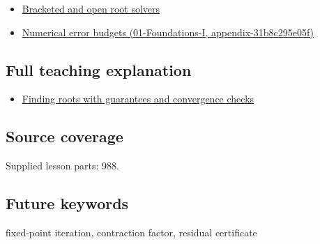 \begin{itemize}
\tightlist
\item
  \hyperref[appendix-f63eb850796d]{Bracketed and open root solvers}
\item
  \href{../01-Foundations-I/main.pdf\#nameddest=appendix-31b8c295e05f}{Numerical error budgets (01-Foundations-I, appendix-31b8c295e05f)}
\end{itemize}

\subsection{Full teaching explanation}\label{appendix-d83b0ad1be7f-full-teaching-explanation}

\begin{itemize}
\tightlist
\item
  \hyperref[02-foundations-ii-ch028-finding-roots-with-guarantees-and-convergence-checks]{Finding roots with guarantees and convergence checks}
\end{itemize}

\subsection{Source coverage}\label{appendix-d83b0ad1be7f-source-coverage}

Supplied lesson parts: 988.

\subsection{Future keywords}\label{appendix-d83b0ad1be7f-future-keywords}

fixed-point iteration, contraction factor, residual certificate
